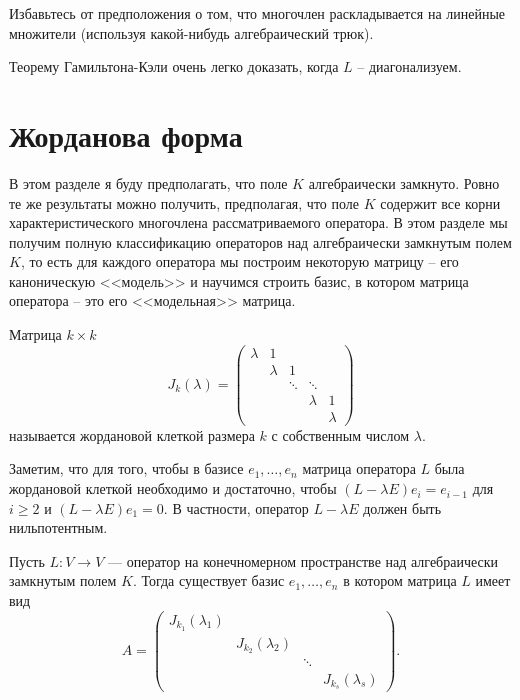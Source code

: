 \upr Избавьтесь от предположения о том, что многочлен раскладывается на линейные множители (используя какой-нибудь  алгебраический трюк).
\eupr


\rm Теорему Гамильтона-Кэли очень легко доказать, когда $L$ -- диагонализуем.
\erm


\section{Жорданова форма}

В этом разделе я буду предполагать, что  поле $K$ алгебраически замкнуто. Ровно те же результаты можно получить, предполагая, что поле $K$ содержит все корни характеристического многочлена рассматриваемого оператора. В этом разделе мы получим полную классификацию операторов над алгебраически замкнутым полем $K$, то есть для каждого оператора мы построим некоторую матрицу -- его каноническую <<модель>> и научимся строить базис, в котором матрица оператора -- это его <<модельная>> матрица.

\dfn
Матрица $k\times k$
$$J_k(\lambda) = \begin{pmatrix}
\lambda& 1&& \\
& \lambda &1& \\
&&\ddots &\ddots& \\
&  && \lambda & 1\\
&  &&& \lambda
\end{pmatrix}
$$
называется жордановой клеткой размера $k$ с собственным числом $\lambda$.
\edfn

\rm Заметим, что для того, чтобы в базисе $e_1,\dots,e_n$ матрица оператора $L$ была жордановой клеткой необходимо и достаточно, чтобы $(L-\lambda E)e_i=e_{i-1}$ для $i\geq 2$ и $(L-\lambda E)e_1=0$. В частности, оператор $L-\lambda E$ должен быть нильпотентным.
\erm







\thrm Пусть $L\colon V \to V$ --- оператор на конечномерном пространстве над алгебраически замкнутым полем $K$.
Тогда существует базис $e_1,\dots, e_n$ в котором матрица $L$ имеет вид
$$A=\begin{pmatrix}
J_{k_1}(\lambda_1) &&&\\
& J_{k_2}(\lambda_2) &&\\
&& \ddots& \\
&&& J_{k_s}(\lambda_s)

\end{pmatrix}.
$$

